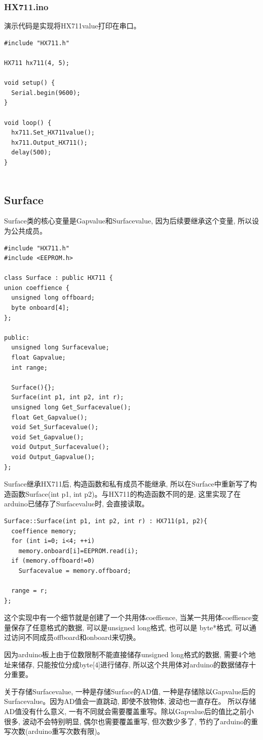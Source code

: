 \documentclass{article}
\begin{document}
\subsubsection{HX711.ino}
演示代码是实现将HX711value打印在串口。
\begin{lstlisting}
#include "HX711.h"

HX711 hx711(4, 5);

void setup() {
  Serial.begin(9600);
}

void loop() {
  hx711.Set_HX711value();
  hx711.Output_HX711();
  delay(500);
}
  
\end{lstlisting}

\subsection{Surface}
Surface类的核心变量是Gapvalue和Surfacevalue, 因为后续要继承这个变量, 所以设为公共成员。
\begin{lstlisting}
#include "HX711.h"
#include <EEPROM.h>

class Surface : public HX711 {
union coeffience {
  unsigned long offboard;
  byte onboard[4];
};

public:
  unsigned long Surfacevalue;
  float Gapvalue;
  int range;

  Surface(){};
  Surface(int p1, int p2, int r);
  unsigned long Get_Surfacevalue();
  float Get_Gapvalue();
  void Set_Surfacevalue();
  void Set_Gapvalue();
  void Output_Surfacevalue();
  void Output_Gapvalue();
};
\end{lstlisting}

Surface继承HX711后, 构造函数和私有成员不能继承, 所以在Surface中重新写了构造函数Surface(int p1, int p2)。与HX711的构造函数不同的是,
这里实现了在arduino已储存了Surfacevalue时, 会直接读取。\par
\begin{lstlisting}
Surface::Surface(int p1, int p2, int r) : HX711(p1, p2){
  coeffience memory;
  for (int i=0; i<4; ++i)
    memory.onboard[i]=EEPROM.read(i);
  if (memory.offboard!=0)
    Surfacevalue = memory.offboard;

  range = r;
};
\end{lstlisting}

这个实现中有一个细节就是创建了一个共用体coeffience, 当某一共用体coeffience变量保存了任意格式的数据, 可以是unsigned long格式, 也可以是
byte*格式, 可以通过访问不同成员offboard和onboard来切换。\par
因为arduino板上由于位数限制不能直接储存unsigned long格式的数据, 需要4个地址来储存, 只能按位分成byte[4]进行储存, 所以这个共用体对arduino的数据储存十分重要。\par
关于存储Surfacevalue, 一种是存储Surface的AD值, 一种是存储除以Gapvalue后的Surfacevalue。因为AD值会一直跳动, 即使不放物体, 波动也一直存在。
所以存储AD值没有什么意义, 一有不同就会需要覆盖重写。除以Gapvalue后的值比之前小很多, 波动不会特别明显, 偶尔也需要覆盖重写, 但次数少多了, 
节约了arduino的重写次数(arduino重写次数有限)。
\end{document}
